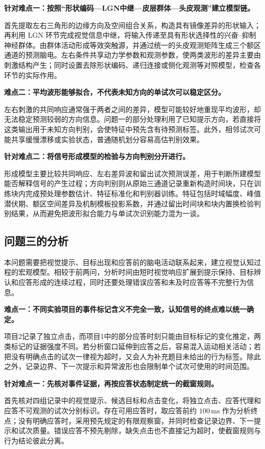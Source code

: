 \documentclass[a4paper]{ctexart}
\numberwithin{figure}{section}       %
\begin{document}
\noindent\textbf{针对难点一：按照“形状编码—LGN中继—皮层群体—头皮观测”建立模型链。}

首先提取左右三角形的边缘方向及空间组合关系，构造具有镜像差异的形状输入；再利用 LGN 环节完成视觉信息中继，将输入传递至具有形状选择性的兴奋--抑制神经群体。由群体活动形成等效突触源，并通过统一的头皮观测矩阵生成三个额区通道的预测脑电。左右条件共享动力学参数和观测参数，使两类波形的差异主要由刺激结构产生；同时设置去除形状编码、递归连接或侧化观测等对照模型，检查各环节的实际作用。

\noindent\textbf{难点二：平均波形能够拟合，不代表未知方向的单试次可以稳定区分。}

左右刺激的共同响应通常强于两者之间的差异，模型可能较好地重现平均波形，却无法稳定预测较弱的方向信息。问题一的部分处理利用了已知提示方向，若直接将这类输出用于未知方向判别，会使特征中预先含有待预测标签。此外，相邻试次可能共享缓慢漂移或实验状态，普通随机划分容易高估判别效果。

\noindent\textbf{针对难点二：将信号形成模型的检验与方向判别分开进行。}

形成模型主要比较共同响应、左右差异波和留出试次预测误差，用于判断所建模型能否解释信号的产生过程；方向判别则从原始三通道记录重新构造时间块，只在训练块内完成预处理参数估计、特征标准化和判别器训练。特征包括时域幅度、峰值潜伏期、额区空间差异及机制模板投影系数，并通过留出时间块和块内置换检验判别结果，从而避免把波形拟合能力与单试次识别能力混为一谈。

\subsection{问题三的分析}

本问题需要把视觉提示、目标出现和应答前的脑电活动联系起来，建立视觉认知过程的宏观模型。相较于前两问，分析时间由短时视觉响应扩展到提示保持、目标辨认和应答形成的连续过程，同时还要处理错误应答和未及时应答等不完整行为信息。

\noindent\textbf{难点一：不同实验项目的事件标记含义不完全一致，认知信号的终点难以统一确定。}

项目2记录了独立点击，而项目1中的部分应答时刻只能由目标标记的变化推定，两类标记的证据强度不同。若分析窗口延伸到应答之后，容易混入运动相关活动；若把没有明确点击的试次一律视为超时，又会人为补充题目未给出的行为标签。除此之外，记录边界、下一次提示和异常波形也会限制单个试次可使用的时间范围。

\noindent\textbf{针对难点一：先核对事件证据，再按应答状态制定统一的截窗规则。}

首先核对四组记录中的视觉提示、候选目标和点击变化，将独立点击、应答代理和应答不可观测的试次分别标识。存在可用应答时，取应答前约 \(100\,\mathrm{ms}\) 作为分析终点；没有明确应答时，采用预先规定的有限观察窗，并同时检查记录边界、下一提示和试次质量。错误应答不预先剔除，缺失点击也不直接记为超时，使截窗规则与行为结论彼此分离。
\end{document}
